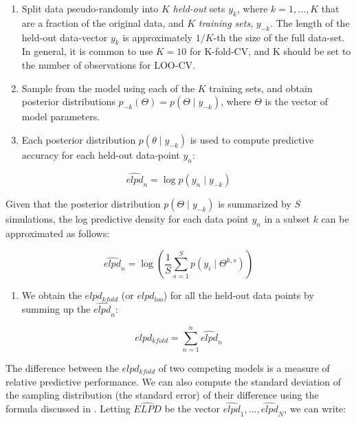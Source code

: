 \documentclass[12pt,]{krantz}
\providecommand{\tightlist}{%
  \setlength{\itemsep}{0pt}\setlength{\parskip}{0pt}}
\theoremstyle{definition}
\theoremstyle{definition}
\theoremstyle{definition}
\theoremstyle{remark}
\begin{document}
\begin{enumerate}
\def\labelenumi{\arabic{enumi}.}
\item
  Split data pseudo-randomly into \(K\) \textit{held-out} sets \(y_k\), where \(k=1,\dots,K\) that are a fraction of the original data, and \(K\) \textit{training sets}, \(y_{-k}\). The length of the held-out data-vector \(y_k\) is approximately \(1/K\)-th the size of the full data-set. In general, it is common to use \(K=10\) for K-fold-CV, and K should be set to the number of observations for LOO-CV. 
\item
  Sample from the model using each of the \(K\) training sets, and obtain posterior distributions \(p_{-k} (\Theta) = p(\Theta\mid y_{-k})\), where \(\Theta\) is the vector of model parameters.
\item
  Each posterior distribution \(p(\theta\mid y_{-k})\) is used to compute predictive accuracy for each held-out data-point \(y_n\):
\end{enumerate}

\begin{equation}
 \widehat{elpd}_n = \log p(y_n \mid y_{-k}) %
  \end{equation}

Given that the posterior distribution \(p(\Theta\mid y_{-k})\) is summarized by \(S\) simulations, the log predictive density for each data point \(y_n\) in a subset \(k\) can be approximated as follows:

\begin{equation}
    \widehat{elpd}_n = \log \left(\frac{1}{S} \sum_{s=1}^S p(y_i\mid \Theta^{k,s})\right)
    \label{eq:pwkfold}
  \end{equation}

\begin{enumerate}
\def\labelenumi{\arabic{enumi}.}
\setcounter{enumi}{4}
\tightlist
\item
  We obtain the \(elpd_{kfold}\) (or \(elpd_{loo}\)) for all the held-out data points by summing up the \(\widehat{elpd}_n\):
\end{enumerate}

\begin{equation} 
    elpd_{kfold} = \sum_{n=1}^n \widehat{elpd}_n
    \label{eq:totalkfold}
  \end{equation}

The difference between the \(elpd_{kfold}\) of two competing models is a measure of relative predictive performance. We can also compute the standard deviation of the sampling distribution (the standard error) of their difference using the formula discussed in \citet{vehtariPracticalBayesianModel2017}. Letting \(\widehat{ELPD}\) be the vector \(\widehat{elpd}_1,\dots,\widehat{elpd}_N\), we can write:
\end{document}
